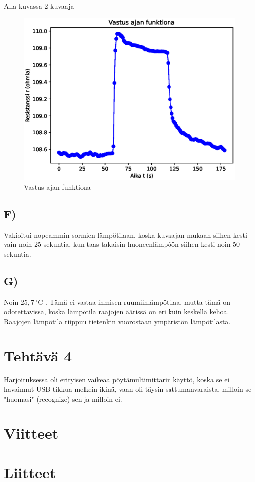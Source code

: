 \documentclass{article}
\begin{document}
Alla kuvassa 2 kuvaaja

\begin{figure}[h!]
    \centering
    \includegraphics[width=1.0\linewidth]{resistance_plot.eps}
    \caption{Vastus ajan funktiona}
    \label{fig:resistance_plot_figure}
\end{figure}
\newpage
\subsection*{F)}
Vakioitui nopeammin sormien lämpötilaan, koska kuvaajan mukaan siihen kesti vain noin 25 sekuntia, kun taas takaisin huoneenlämpöön siihen kesti noin 50 sekuntia.
\subsection*{G)}
Noin $25,7\,^\circ\text{C}$ . Tämä ei vastaa ihmisen ruumiinlämpötilaa, mutta tämä on odotettavissa, koska lämpötila raajojen äärissä on eri kuin keskellä kehoa. Raajojen lämpötila riippuu tietenkin vuorostaan ympäristön lämpötilasta.

\section*{Tehtävä 4}

Harjoituksessa oli erityisen vaikeaa pöytämultimittarin käyttö, 
koska se ei havainnut USB-tikkua melkein ikinä, vaan oli täysin sattumanvaraista, 
milloin se "huomasi" (recognize) sen ja milloin ei.

\section*{Viitteet}


\section*{Liitteet}



\end{document}
